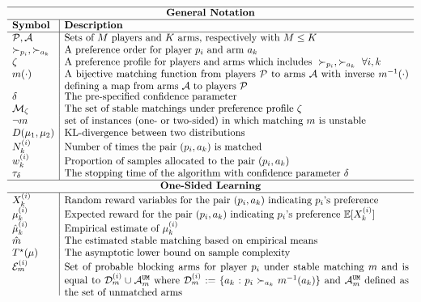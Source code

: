 \documentclass{article}
\newcommand{\E}{\mathbb{E}}
\begin{document}
$$
\begin{array}{l|l}
\hline
\multicolumn{2}{c}{\textbf{General Notation}} \\
\hline
\textbf{Symbol} & \textbf{Description} \\
\hline
\mathcal{P}, \mathcal{A} & \text{Sets of } M \text{ players and } K \text{ arms, respectively with $M\leq K$} \\
\succ_{p_i}, \succ_{a_k} & \text{A preference order for player}\ p_i\ \text{and arm}\ a_k\\  
\zeta & \text{A preference profile for players and arms which includes}\ \succ_{p_i}, \succ_{a_k}\ \forall i,k \\
m(\cdot) & \parbox[t]{12cm}{A bijective matching function from players $\mathcal{P}$ to arms $\mathcal{A}$ with inverse $m^{-1}(\cdot)$ defining a map from arms $\mathcal{A}$ to players $\mathcal{P}$}  \\
\delta & \text{The pre-specified confidence parameter} \\
\mathcal{M}_{\zeta} & \text{The set of stable matchings under preference profile } \zeta \\
\neg m & \text{set of instances (one- or two-sided) in which matching $m$ is unstable}\\
D(\mu_1,\mu_2) & \text{KL-divergence between two distributions} \\
N_k^{(i)} & \text{Number of times the pair } (p_i, a_k) \text{ is matched} \\
w_k^{(i)} & \text{Proportion of samples allocated to the pair } (p_i, a_k) \\
\tau_{\delta} & \text{The stopping time of the algorithm with confidence parameter $\delta$} \\
\hline
\multicolumn{2}{c}{\textbf{One-Sided Learning}} \\
\hline
X_k^{(i)} & \text{Random reward variables for the pair $(p_i, a_k)$ indicating $p_i$'s preference}  \\
\mu^{(i)}_k & \text{Expected reward for the pair $(p_i, a_k)$ indicating $p_i$'s preference}\ \E[X_k^{(i)}] \\
\hat{\mu}^{(i)}_k & \text{Empirical estimate of $\mu^{(i)}_k$}\\
\hat{m} & \text{The estimated stable matching based on empirical means} \\
T^{\star}(\mu) & \text{The asymptotic lower bound on sample complexity} \\
\mathcal{E}_m^{(i)} &  \parbox[t]{12cm}{Set of probable blocking arms for player $p_i$ under stable matching $m$ and is equal to $\mathcal{D}^{(i)}_m\cup \mathcal{A}^{\texttt{UM}}_m$ where $\mathcal{D}^{(i)}_m:=\{a_k:p_i\succ_{a_k}m^{-1}(a_k)\}$ and $\mathcal{A}^{\texttt{UM}}_m$ defined as the set of unmatched arms}  \\

\end{array}$$
\end{document}
